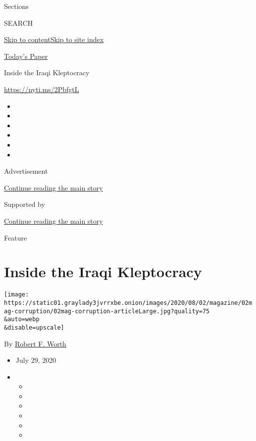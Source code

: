 Sections

SEARCH

\protect\hyperlink{site-content}{Skip to
content}\protect\hyperlink{site-index}{Skip to site index}

\href{https://myaccount.nytimes3xbfgragh.onion/auth/login?response_type=cookie\&client_id=vi}{}

\href{https://www.nytimes3xbfgragh.onion/section/todayspaper}{Today's
Paper}

Inside the Iraqi Kleptocracy

\url{https://nyti.ms/2PbfgtL}

\begin{itemize}
\item
\item
\item
\item
\item
\item
\end{itemize}

Advertisement

\protect\hyperlink{after-top}{Continue reading the main story}

Supported by

\protect\hyperlink{after-sponsor}{Continue reading the main story}

Feature

\hypertarget{inside-the-iraqi-kleptocracy}{%
\section{Inside the Iraqi
Kleptocracy}\label{inside-the-iraqi-kleptocracy}}

\texttt{[image: https://static01.graylady3jvrrxbe.onion/images/2020/08/02/magazine/02mag-corruption/02mag-corruption-articleLarge.jpg?quality=75\\\&auto=webp\\\&disable=upscale]}

By \href{https://www.nytimes3xbfgragh.onion/by/robert-f-worth}{Robert F.
Worth}

\begin{itemize}
\item
  July 29, 2020
\item
  \begin{itemize}
  \item
  \item
  \item
  \item
  \item
  \item
  \end{itemize}
\end{itemize}

